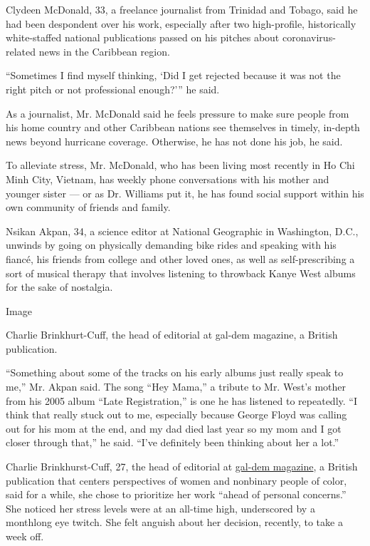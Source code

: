 Clydeen McDonald, 33, a freelance journalist from Trinidad and Tobago,
said he had been despondent over his work, especially after two
high-profile, historically white-staffed national publications passed on
his pitches about coronavirus-related news in the Caribbean region.

``Sometimes I find myself thinking, `Did I get rejected because it was
not the right pitch or not professional enough?''' he said.

As a journalist, Mr. McDonald said he feels pressure to make sure people
from his home country and other Caribbean nations see themselves in
timely, in-depth news beyond hurricane coverage. Otherwise, he has not
done his job, he said.

To alleviate stress, Mr. McDonald, who has been living most recently in
Ho Chi Minh City, Vietnam, has weekly phone conversations with his
mother and younger sister --- or as Dr. Williams put it, he has found
social support within his own community of friends and family.

Nsikan Akpan, 34, a science editor at National Geographic in Washington,
D.C., unwinds by going on physically demanding bike rides and speaking
with his fiancé, his friends from college and other loved ones, as well
as self-prescribing a sort of musical therapy that involves listening to
throwback Kanye West albums for the sake of nostalgia.

Image

Charlie Brinkhurt-Cuff, the head of editorial at gal-dem magazine, a
British publication.

``Something about some of the tracks on his early albums just really
speak to me,'' Mr. Akpan said. The song ``Hey Mama,'' a tribute to Mr.
West's mother from his 2005 album ``Late Registration,'' is one he has
listened to repeatedly. ``I think that really stuck out to me,
especially because George Floyd was calling out for his mom at the end,
and my dad died last year so my mom and I got closer through that,'' he
said. ``I've definitely been thinking about her a lot.''

Charlie Brinkhurst-Cuff, 27, the head of editorial at
\href{https://gal-dem.com/}{gal-dem magazine}, a British publication
that centers perspectives of women and nonbinary people of color, said
for a while, she chose to prioritize her work ``ahead of personal
concerns.'' She noticed her stress levels were at an all-time high,
underscored by a monthlong eye twitch. She felt anguish about her
decision, recently, to take a week off.


